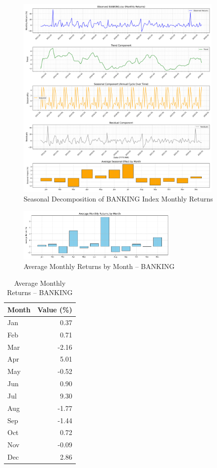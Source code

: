 \documentclass[12pt]{article}
\begin{document}
\begin{figure}[h!]
    \centering
    \includegraphics[width=0.9\textwidth]{decomposition_outputs/BANKING_seasonal_decomposition.png}
    \caption{Seasonal Decomposition of BANKING Index Monthly Returns}
\end{figure}

\begin{figure}[h!]
    \centering
    \includegraphics[width=0.7\textwidth]{decomposition_outputs/BANKING_avg_monthly_returns.png}
    \caption{Average Monthly Returns by Month -- BANKING}
\end{figure}

\begin{table}[h!]
\centering
\caption{Average Monthly Returns -- BANKING}
\begin{tabular}{l r}
\toprule
Month & Value (\%) \\
\midrule
Jan & 0.37 \\
Feb & 0.71 \\
Mar & -2.16 \\
Apr & 5.01 \\
May & -0.52 \\
Jun & 0.90 \\
Jul & 9.30 \\
Aug & -1.77 \\
Sep & -1.44 \\
Oct & 0.72 \\
Nov & -0.09 \\
Dec & 2.86 \\
\bottomrule
\end{tabular}
\end{table}
\end{document}
